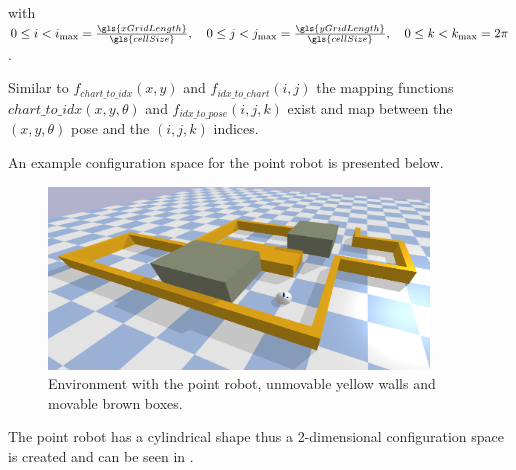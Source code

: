 with $0 \leq i < i_{\textrm{max}} = \frac{\gls{xGridLength}}{\gls{cellSize}}, \quad 0 \leq j < j_{\textrm{max}} = \frac{\gls{yGridLength}}{\gls{cellSize}}, \quad 0 \leq k < k_{\textrm{max}} = 2\pi$.\bs

Similar to $f_\mathit{chart\_to\_idx}(x, y)$ and $f_\mathit{idx\_to\_chart}(i,j)$ the mapping functions $\mathit{chart\_to\_idx}(x, y, \theta)$ and $f_\mathit{idx\_to\_pose}(i, j, k)$ exist and map between the $(x, y, \theta)$ pose and the $(i, j, k)$ indices.\bs

An example configuration space for the point robot is presented below.
\begin{figure}[H]
    \centering
    \includegraphics[width=0.9\textwidth]{figures/planning/two_push_to_freedom_env}
    \caption{Environment with the point robot, unmovable yellow walls and movable brown boxes.}%
    \label{fig:two_pushes_to_freedom_env}
\end{figure}

The point robot has a cylindrical shape thus a 2-dimensional configuration space is created and can be seen in .

